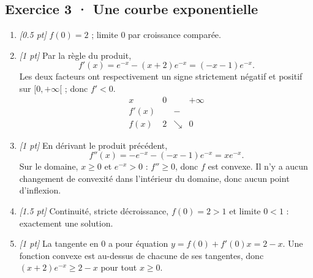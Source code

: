 \subsection*{Exercice 3 · Une courbe exponentielle}\begin{enumerate}

\item \textit{[\num{0,5} pt]} $f(0)=2$ ; limite $0$ par croissance comparée.

\item \textit{[1 pt]} Par la règle du produit,
\[f'(x)=e^{-x}-(x+2)e^{-x}=(-x-1)e^{-x}.\]
Les deux facteurs ont respectivement un signe strictement négatif et positif sur $[0,+\infty[$ ; donc $f'<0$.
\[\begin{array}{c|ccc}x&0&&+\infty\\\hline f'(x)&&-&\\\hline f(x)&2&\searrow&0\end{array}\]

\item \textit{[1 pt]} En dérivant le produit précédent,
\[f''(x)=-e^{-x}-(-x-1)e^{-x}=xe^{-x}.\]
Sur le domaine, $x\ge0$ et $e^{-x}>0$ : $f''\ge0$, donc $f$ est convexe. Il n'y a aucun changement de convexité dans l'intérieur du domaine, donc aucun point d'inflexion.

\item \textit{[\num{1,5} pt]} Continuité, stricte décroissance, $f(0)=2>1$ et limite $0<1$ : exactement une solution.

\item \textit{[1 pt]} La tangente en $0$ a pour équation $y=f(0)+f'(0)x=2-x$. Une fonction convexe est au-dessus de chacune de ses tangentes, donc $(x+2)e^{-x}\ge 2-x$ pour tout $x\ge0$.

\end{enumerate}

